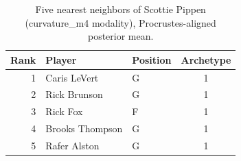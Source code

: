 \begin{table}[htbp]
  \centering\small
  \begin{tabular}{rllc}
    \toprule
    Rank & Player & Position & Archetype \\
    \midrule
    1 & Caris LeVert & G & 1 \\
    2 & Rick Brunson & G & 1 \\
    3 & Rick Fox & F & 1 \\
    4 & Brooks Thompson & G & 1 \\
    5 & Rafer Alston & G & 1 \\
    \bottomrule
  \end{tabular}
  \caption{Five nearest neighbors of Scottie Pippen (curvature_m4 modality), Procrustes-aligned posterior mean.}
  \label{tab:Scottie_Pippen_neighbors_curvature_m4}
\end{table}

